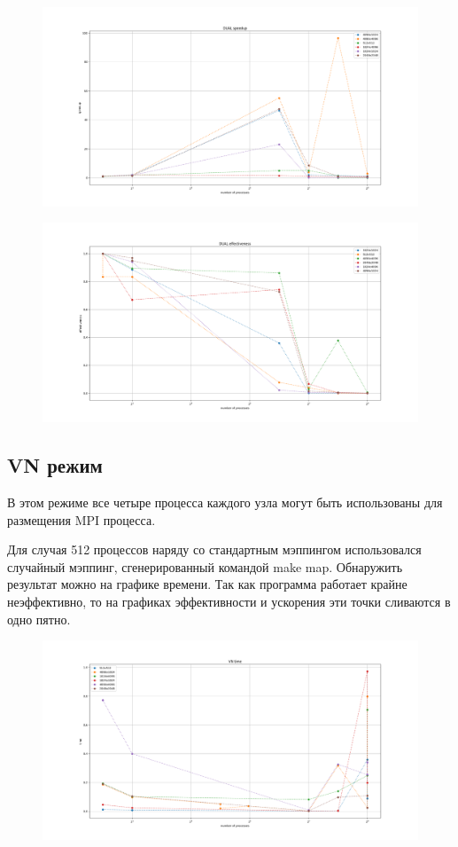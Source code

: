 \documentclass[14pt]{extarticle}
\begin{document}
\begin{figure}[H]
	\centering
	\includegraphics[scale=0.4]{DUAL_speedup}
\end{figure}

\begin{figure}[H]
	\centering
	\includegraphics[scale=0.4]{DUAL_effectiveness}
\end{figure}

\subsection{VN режим}
В этом режиме все четыре процесса каждого узла могут быть использованы для размещения MPI процесса.

Для случая 512 процессов наряду со стандартным мэппингом использовался случайный мэппинг, сгенерированный командой make map. Обнаружить результат можно на графике времени. Так как программа работает крайне неэффективно, то на графиках эффективности и ускорения эти точки сливаются в одно пятно.

\begin{figure}[H]
	\centering
	\includegraphics[scale=0.4]{VN_time}
\end{figure}
\end{document}
